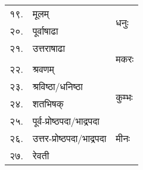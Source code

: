 {\begin{tabular}{|l|l|l|}
\cline{3-3}\cline{1-2}\cline{1-2}\multirow{4}{*}{१९.} & \multirow{4}{*}{मूलम्}                    &  \multirow{9}{*}{धनुः}\\
\\
\\
\\
\cline{1-2}\multirow{4}{*}{२०.} & \multirow{4}{*}{पूर्वाषाढा}               &  \\
\\
\\
\\
\cline{1-2}\multirow{4}{*}{२१.} & \multirow{4}{*}{उत्तराषाढा}               &  \\
\cline{3-3} & & \multirow{9}{*}{मकरः}\\\\
\\
\\
\cline{1-2}\multirow{4}{*}{२२.} & \multirow{4}{*}{श्रवणम्}                  &  \\
\\
\\
\\
\cline{1-2}\multirow{4}{*}{२३.} & \multirow{4}{*}{श्रविष्ठा/धनिष्ठा}        &  \\
\\
\cline{3-3} & & \multirow{9}{*}{कुम्भः}\\
\\
\cline{1-2}\multirow{4}{*}{२४.} & \multirow{4}{*}{शतभिषक्}                  &  \\
\\
\\
\\
\cline{1-2}\multirow{4}{*}{२५.} & \multirow{4}{*}{पूर्व-प्रोष्ठपदा/भाद्रपदा}&  \\
\\
\\
\cline{3-3} & & \multirow{9}{*}{मीनः}\\
\cline{1-2}\multirow{4}{*}{२६.} & \multirow{4}{*}{उत्तर-प्रोष्ठपदा/भाद्रपदा}&  \\
\\
\\
\\
\cline{1-2}\multirow{4}{*}{२७.} & \multirow{4}{*}{रेवती}                    &  \\
\\
\\
\\\hline
\end{tabular}
}


